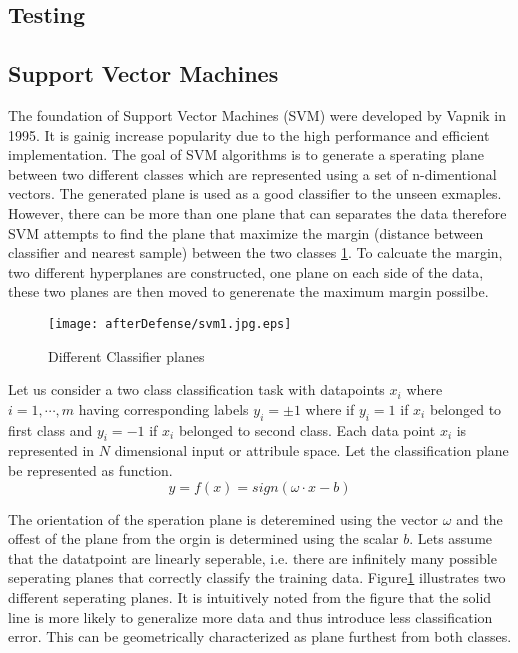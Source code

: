 \subsection {Testing}

\subsection{Support Vector Machines}
\label{Sec:SVMdetail}
The foundation of Support Vector Machines (SVM) were developed by Vapnik \cite{svmintroduce} in 1995. It is gainig increase popularity due to the high performance and efficient implementation. The goal of SVM algorithms is to generate a sperating plane between two different classes which are represented using a set of n-dimentional vectors. The generated plane is used as a good classifier to the unseen exmaples. However, there can be more than one plane that can separates the data therefore SVM attempts to find the plane that maximize the margin (distance between classifier and nearest sample) between the two classes \ref{fig:svm1}. To calcuate the margin, two different hyperplanes are constructed, one plane on each side of the data, these two planes are then moved to generenate the maximum margin possilbe.  
\begin{figure}
	\centering
		\texttt{[image: afterDefense/svm1.jpg.eps]}
	\caption{Different Classifier planes }
	\label{fig:svm1}
\end{figure}


Let us consider  a two class classification task with datapoints $x_i$ where $i=1,\cdots,m$ having corresponding labels $y_i=\pm1$ where if  $y_i=1$ if $x_i$ belonged to first class and $y_i=-1$ if $x_i$ belonged to second class. Each data  point $x_i$ is represented in $N$ dimensional input or attribule space. Let the classification plane be represented as function. 
\begin{equation}
 y=f(x)=sign(\omega \cdot x - b)
\label{eq:planeEq}
\end{equation}

 The orientation of the speration plane is deteremined using the vector $\omega$ and the offest of the plane from the orgin is determined using the scalar $b$.  Lets assume that the datatpoint are linearly seperable, i.e. there are infinitely many possible seperating planes that correctly classify the training data. Figure\ref{fig:svm1} illustrates two different seperating planes. It is intuitively noted from the figure that the solid line is more likely to generalize more data and thus introduce less classification error. This can be geometrically characterized as plane furthest from both classes.     %

